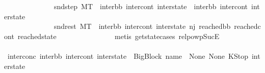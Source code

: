 \begin{isabellebody}
\ \ \ \ \ \ \ \ \ \ \ \ \ \ snd{\isacharunderscore}{\kern0pt}step{\isacharcolon}{\kern0pt}\ {\isachardoublequoteopen}M{\isacharcomma}{\kern0pt}{\isasymLambda}{\isacharcomma}{\kern0pt}{\isasymGamma}{\isacharcomma}{\kern0pt}{\isasymOmega}{\isacharcomma}{\kern0pt}T\ {\isasymturnstile}\ {\isasymlangle}{\isacharparenleft}{\kern0pt}inter{\isacharunderscore}{\kern0pt}bb{\isacharcomma}{\kern0pt}\ inter{\isacharunderscore}{\kern0pt}cont{\isacharcomma}{\kern0pt}\ inter{\isacharunderscore}{\kern0pt}state{\isacharparenright}{\kern0pt}{\isasymrangle}\ {\isasymlongrightarrow}\ {\isacharparenleft}{\kern0pt}inter{\isacharunderscore}{\kern0pt}bb{}{\isacharcomma}{\kern0pt}\ inter{\isacharunderscore}{\kern0pt}cont{}{\isacharcomma}{\kern0pt}\ inter{\isacharunderscore}{\kern0pt}state{}{\isacharparenright}{\kern0pt}{\isachardoublequoteclose}\ \isanewline
\ \ \ \ \ \ \ \ \ \ \ \ \ \ snd{\isacharunderscore}{\kern0pt}rest{\isacharcolon}{\kern0pt}\ {\isachardoublequoteopen}M{\isacharcomma}{\kern0pt}{\isasymLambda}{\isacharcomma}{\kern0pt}{\isasymGamma}{\isacharcomma}{\kern0pt}{\isasymOmega}{\isacharcomma}{\kern0pt}T\ {\isasymturnstile}\ {\isacharparenleft}{\kern0pt}inter{\isacharunderscore}{\kern0pt}bb{}{\isacharcomma}{\kern0pt}\ inter{\isacharunderscore}{\kern0pt}cont{}{\isacharcomma}{\kern0pt}\ inter{\isacharunderscore}{\kern0pt}state{}{\isacharparenright}{\kern0pt}\ {\isacharminus}{\kern0pt}n{\isasymlongrightarrow}{\isacharcircum}{\kern0pt}j{\isacharprime}{\kern0pt}{\isacharprime}{\kern0pt}\ {\isacharparenleft}{\kern0pt}reached{\isacharunderscore}{\kern0pt}bb{\isacharcomma}{\kern0pt}\ reached{\isacharunderscore}{\kern0pt}cont{\isacharcomma}{\kern0pt}\ reached{\isacharunderscore}{\kern0pt}state{\isacharparenright}{\kern0pt}{\isachardoublequoteclose}\isanewline
\ \ \ \ \ \ \ \ \ \ \ \ \ \ \isamarkupfalse%
\ {\isacharparenleft}{\kern0pt}metis\ get{\isacharunderscore}{\kern0pt}state{\isachardot}{\kern0pt}cases\ relpowp{\isacharunderscore}{\kern0pt}Suc{\isacharunderscore}{\kern0pt}E{}{\isacharparenright}{\kern0pt}\isanewline
\ \ \ \ \ \ \ \ \ \ \ \ \isamarkupfalse%
\ \isamarkupfalse%
\ inter{}{\isacharunderscore}{\kern0pt}conc{\isacharcolon}{\kern0pt}\ {\isachardoublequoteopen}{\isacharparenleft}{\kern0pt}inter{\isacharunderscore}{\kern0pt}bb{}{\isacharcomma}{\kern0pt}\ inter{\isacharunderscore}{\kern0pt}cont{}{\isacharcomma}{\kern0pt}\ inter{\isacharunderscore}{\kern0pt}state{}{\isacharparenright}{\kern0pt}\ {\isacharequal}{\kern0pt}\ {\isacharparenleft}{\kern0pt}{\isacharparenleft}{\kern0pt}BigBlock\ name\ {\isacharbrackleft}{\kern0pt}{\isacharbrackright}{\kern0pt}\ None\ None{\isacharparenright}{\kern0pt}{\isacharcomma}{\kern0pt}\ KStop{\isacharcomma}{\kern0pt}\ inter{\isacharunderscore}{\kern0pt}state{\isacharparenright}{\kern0pt}{\isachardoublequoteclose}\ \isanewline

\end{isabellebody}
